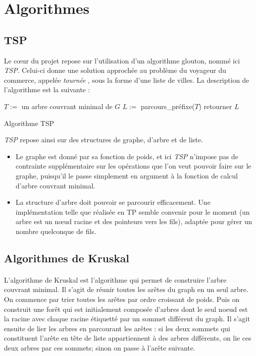 \documentclass[a4paper]{article}
\begin{document}
\bigskip

\section{Algorithmes}

\subsection{TSP}
Le cœur du projet repose sur l'utilisation d'un algorithme glouton, nommé ici \emph{TSP}. Celui-ci donne une solution approchée au problème du voyageur du commerce, appelée \textit{tournée} , sous la forme d'une liste de villes. La description de l'algorithme est la suivante :

\begin{algorithm}[H]
  \SetAlgoLined
  $T := $ un arbre couvrant minimal de $G$\;
  $L := $ parcours\_préfixe($T$)\;
  retourner $L$\;
  \caption{Algorithme TSP}
\end{algorithm}

\emph{TSP} repose ainsi sur des structures de graphe, d'arbre et de liste. \\
\begin{itemize}
\item Le graphe est donné par sa fonction de poids, et ici \emph{TSP} n'impose pas de contrainte supplémentaire sur les opérations que l'on veut pouvoir faire sur le graphe, puisqu'il le passe simplement en argument à la fonction de calcul d'arbre couvrant minimal.
\item La structure d'arbre doit pouvoir se parcourir efficacement. Une implémentation telle que réalisée en TP semble convenir pour le moment (un arbre est un nœud racine et des pointeurs vers les fils), adaptée pour gérer un nombre quelconque de fils.
\end{itemize}

\subsection{Algorithmes de Kruskal}

\paragraph*{} L'algorithme de Kruskal est l'algorithme qui permet de construire l'arbre couvrant minimal. Il s'agit de réunir toutes les arêtes du graph en un seul arbre. On commence par trier toutes les arêtes par ordre croissant de poids. Puis on construit une forêt qui est initialement composée d'arbres dont le seul noeud est la racine avec chaque racine étiquetté par un sommet différent du graph. Il s'agit ensuite de lier les arbres en parcourant les arêtes : si les deux sommets qui constituent l'arête en tête de liste appartiennent à des arbres différents, on lie ces deux arbres par ces sommets; sinon on passe à l'arête suivante.
\end{document}
